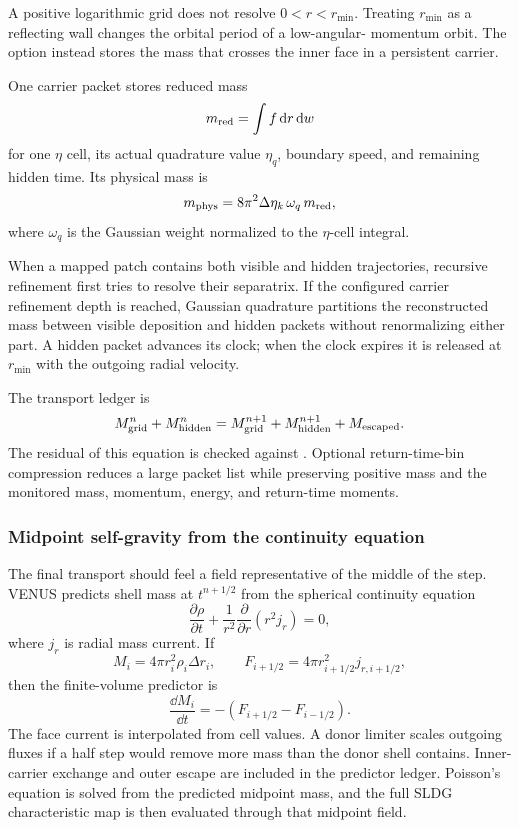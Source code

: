 A positive logarithmic grid does not resolve \(0<r<r_{\min}\).  Treating
\(r_{\min}\) as a reflecting wall changes the orbital period of a low-angular-
momentum orbit.  The option
 instead stores the mass that crosses
the inner face in a persistent carrier.

One carrier packet stores reduced mass
\[
 m_{\rm red}=\int f\,\mathrm d r\,\mathrm d w
\]
for one \(\eta\) cell, its actual quadrature value \(\eta_q\), boundary speed,
and remaining hidden time.  Its physical mass is
\[
 m_{\rm phys}=8\pi^2\Delta\eta_k\,\omega_q\,m_{\rm red},
\]
where \(\omega_q\) is the Gaussian weight normalized to the \(\eta\)-cell
integral.

When a mapped patch contains both visible and hidden trajectories, recursive
refinement first tries to resolve their separatrix.  If the configured carrier
refinement depth is reached, Gaussian quadrature partitions the reconstructed
mass between visible deposition and hidden packets without renormalizing
either part.  A hidden packet advances its clock; when the clock expires it is
released at \(r_{\min}\) with the outgoing radial velocity.

The transport ledger is
\[
 M_{\rm grid}^{n}+M_{\rm hidden}^{n}
 =M_{\rm grid}^{n+1}+M_{\rm hidden}^{n+1}+M_{\rm escaped}.
\]
The residual of this equation is checked against
.  Optional return-time-bin compression
reduces a large packet list while preserving positive mass and the monitored
mass, momentum, energy, and return-time moments.

\subsubsection{Midpoint self-gravity from the continuity equation}

The final transport should feel a field representative of the middle of the
step.  VENUS predicts shell mass at \(t^{n+1/2}\) from the spherical
continuity equation
\[
 \frac{\partial\rho}{\partial t}
 +\frac{1}{r^2}\frac{\partial}{\partial r}(r^2j_r)=0,
\]
where \(j_r\) is radial mass current.  If
\[
 M_i=4\pi r_i^2\rho_i\Delta r_i,
 \qquad
 F_{i+1/2}=4\pi r_{i+1/2}^2j_{r,i+1/2},
\]
then the finite-volume predictor is
\[
 \frac{\dd M_i}{\dd t}
 =-\left(F_{i+1/2}-F_{i-1/2}\right).
\]
The face current is interpolated from cell values.  A donor limiter scales
outgoing fluxes if a half step would remove more mass than the donor shell
contains.  Inner-carrier exchange and outer escape are included in the
predictor ledger.  Poisson's equation is solved from the predicted midpoint
mass, and the full SLDG characteristic map is then evaluated through that
midpoint field.

